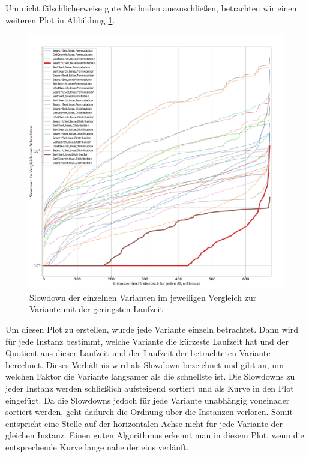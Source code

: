 Um nicht fälschlicherweise \glqq gute\grqq{} Methoden auszuschließen,
betrachten wir einen weiteren Plot in Abbildung \ref{fig:messung_slowdown}. 
\begin{figure}
\centering
	\includegraphics[width = 1\textwidth]{figures/slowdown.pdf}
	\caption{Slowdown der einzelnen Varianten im jeweiligen Vergleich zur Variante mit der geringsten Laufzeit}
	\label{fig:messung_slowdown}
\end{figure}
Um diesen Plot zu erstellen, wurde jede Variante einzeln betrachtet.
Dann wird für jede Instanz bestimmt, welche Variante die kürzeste Laufzeit hat und der Quotient
aus dieser Laufzeit und der Laufzeit der betrachteten Variante berechnet. Dieses Verhältnis wird als Slowdown
bezeichnet und gibt an, um welchen Faktor die Variante langsamer als die schnellste ist. Die Slowdowns
zu jeder Instanz werden schließlich aufsteigend sortiert und als Kurve in den Plot eingefügt.
Da die Slowdowns jedoch für jede Variante unabhängig voneinader sortiert werden, geht dadurch 
die Ordnung über die Instanzen verloren. Somit entspricht eine Stelle auf der horizontalen Achse 
nicht für jede Variante der gleichen Instanz. Einen \glqq guten\grqq{} Algorithmus erkennt man in diesem
Plot, wenn die entsprechende Kurve lange nahe der eins verläuft.
\\

